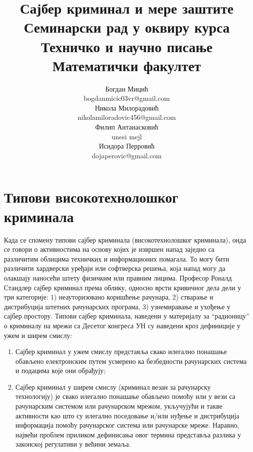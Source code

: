 \documentclass[a4paper]{article}
\begin{document}
	\title{Сајбер криминал и мере заштите\\ \small{Семинарски рад у оквиру курса Техничко и научно писање\\ Математички факултет}}
	
	\author{Богдан Мицић\\ bogdanmicic03vr@gmail.com\\ Никола Милорадовић\\ nikolamiloradovic456@gmail.com\\ Филип Антанасковић\\ unesi mejl\\ Исидора Перровић\\ dojaperovic@gmail.com} 
	\maketitle
	\tableofcontents
	\newpage
	\section{Типови високотехнолошког криминала}
	\label{sec:TipoviVisKri}
	Када се спомену типови сајбер криминала (високотехнолошког
	криминала), онда се говори о активностима на основу којих је извршен напад заједно са различитим облицима техничких и информационих помагала. То могу бити различити хардверски уређаји или софтверска решења, која напад могу да олакшају наносећи штету физичким или правним лицима. \newline
	Професор Роналд Стандлер сајбер криминал према облику, односно врсти кривичног дела дели у три категорије: 1) неауторизовано коришћење рачунара, 2) стварање и дистрибуција штетних рачунарских програма, 3) узнемиравање и ухођење у сајбер простору. \newline
	Типови сајбер криминала, наведени у материјалу за “радионицу” о криминалу на мрежи са Десетог конгреса УН су наведени кроз дефиниције у ужем и ширем смислу:
	\begin{enumerate}
		\item Сајбер криминал у ужем смислу представља свако илегално понашање обављено електронским путем усмерено ка безбедности рачунарских система и подацима које они обрађују;
		\item Сајбер криминал у ширем смислу (криминал везан за рачунарску технологију) је свако илегално понашање обављено помоћу или у вези са рачунарским системом или рачунарском мрежом, укључујући и такве активности као што су илегално поседовање и/или нуђење и дистрибуција информација помоћу рачунарског система или рачунарске мреже. Наравно, највећи проблем приликом дефинисања овог термина представља разлика у законској регулативи у већини земаља.
	\end{enumerate}
	
\end{document}
